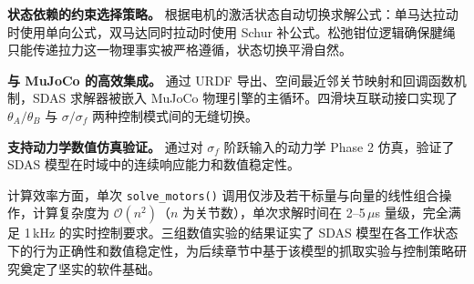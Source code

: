 \documentclass[12pt,a4paper]{report}
\begin{document}
\textbf{状态依赖的约束选择策略。} 根据电机的激活状态自动切换求解公式：单马达拉动时使用单向公式，双马达同时拉动时使用 Schur 补公式。松弛钳位逻辑确保腱绳只能传递拉力这一物理事实被严格遵循，状态切换平滑自然。

\textbf{与 MuJoCo 的高效集成。} 通过 URDF 导出、空间最近邻关节映射和回调函数机制，SDAS 求解器被嵌入 MuJoCo 物理引擎的主循环。四滑块互联动接口实现了 $\theta_A/\theta_B$ 与 $\sigma/\sigma_f$ 两种控制模式间的无缝切换。

\textbf{支持动力学数值仿真验证。} 通过对 $\sigma_f$ 阶跃输入的动力学 Phase 2 仿真，验证了 SDAS 模型在时域中的连续响应能力和数值稳定性。

计算效率方面，单次 \lstinline{solve_motors()} 调用仅涉及若干标量与向量的线性组合操作，计算复杂度为 $\mathcal{O}(n^2)$（$n$ 为关节数），单次求解时间在 2--5\,$\mu$s 量级，完全满足 1\,kHz 的实时控制要求。三组数值实验的结果证实了 SDAS 模型在各工作状态下的行为正确性和数值稳定性，为后续章节中基于该模型的抓取实验与控制策略研究奠定了坚实的软件基础。
\end{document}
